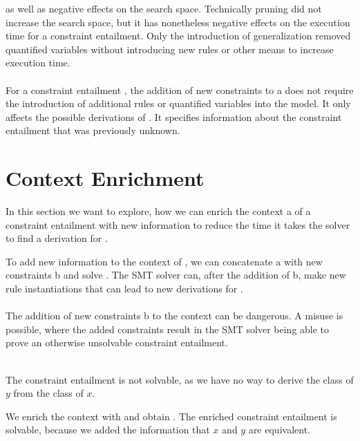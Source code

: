 as well as negative effects on the search space.
Technically pruning did not increase the search space,
but it has nonetheless negative effects on the execution time
for a constraint entailment.
Only the introduction of generalization removed quantified variables
without introducing new rules or other means to increase execution time.\\
\\
For a constraint entailment ,
the addition of new constraints to \ovl a
does not require the introduction of
additional rules or quantified variables into the model.
It only affects the possible derivations of .
It specifies information about the constraint entailment
that was previously unknown.
\newpage

\section{Context Enrichment}
\label{sec:enrichment}
In this section we want to explore,
how we can enrich the context \ovl a
of a constraint entailment 
with new information to reduce
the time it takes the solver to find a derivation for .

To add new information to the context of ,
we can concatenate \ovl a with new constraints \ovl b
and solve .
The SMT solver can, after the addition of \ovl b,
make new rule instantiations that
can lead to new derivations for .\\
\\
The addition of new constraints \ovl b to the context
can be dangerous.
A misuse is possible, where the added constraints
result in the SMT solver being able to
prove an otherwise unsolvable constraint entailment.

\begin{example}
\label{ex:enrich-context-misuse}\quad\\
The constraint entailment 
is not solvable,
as we have no way to derive the class of $y$ from the class of $x$.

We enrich the context with  and obtain
.
The enriched constraint entailment is solvable,
because we added the information that $x$ and $y$ are equivalent.
\end{example}

